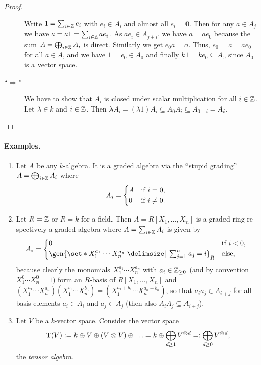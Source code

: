 \documentclass[12pt,a4paper]{scrartcl}
\theoremstyle{cplain}
\theoremstyle{cplain}
\theoremstyle{cplain}
\theoremstyle{definition}
\begin{document}
\begin{otherlanguage}{english}
\begin{proof}
\begin{description}
    Write $1 = \sum_{i \in \mathbb Z} e_i$ with $e_i \in A_i$ and almost all $e_i=0$. Then for any $a \in A_j$ we have $a = a1 = \sum_{i \in \mathbb Z}ae_i$. As $ae_i\in A_{j+i}$, we have $a = ae_0$ because the sum $A=\bigoplus_{i \in \mathbb Z}A_i$ is direct. Similarly we get $e_0a = a$. Thus, $e_0 = a = ae_0$ for all $a\in A$, and we have $1 = e_0 \in A_0$ and finally $k1 = ke_0 \subseteq A_0$ since $A_0$ is a vector space.
    \item[\enquote{$\Rightarrow$}] We have to show that $A_i$ is closed under scalar multiplication for all $i \in \mathbb Z$. Let $\lambda \in k$ and $i\in \mathbb Z$. Then $\lambda A_i = (\lambda1)A_i \subseteq A_0A_i \subseteq A_{0+i} = A_i$.
    \qedhere
  \end{description}
\end{proof}

\paragraph{Examples.}
\begin{enumerate}
  \item Let $A$ be any $k$-algebra. It is a graded algebra via the \enquote{stupid grading} $A = \bigoplus_{i \in \mathbb Z} A_i$ where \[ A_i = \begin{cases*}
                                 A & if $i=0$, \\
                                 0 & if $i \neq 0$.
                               \end{cases*} \]
  \item Let $R= \mathbb Z$ or $R = k$ for a field. Then $A= R[X_1,\ldots,X_n]$ is a graded ring respectively a graded algebra where $A= \sum_{i \in \mathbb Z} A_i$ is given by \[ A_i = \begin{cases*}
                                                                 0 & if $i<0$, \\
                                                                 \gen{\set*{X_1^{a_1}\cdots X_n^{a_n} \given \sum_{j=1}^n a_j =i}}_R & else,
                                                               \end{cases*} \]
  because clearly the monomials $X_1^{a_1}\cdots X_n^{a_n}$ with $a_i \in \mathbb Z_{\ge0}$ (and by convention $X_1^0\cdots X_n^0=1$) form an $R$-basis of $R[X_1,\ldots,X_n]$ and $(X_1^{a_1}\cdots X_n^{a_n})(X_1^{b_1}\cdots X_n^{b_n}) = (X_1^{a_1+b_1}\cdots X_n^{a_n+b_n})$, so that $a_ia_j \in A_{i+j}$ for all basis elements $a_i \in A_i$ and $a_j \in A_j$ (then also $A_iA_j \subseteq A_{i+j}$).
  \item Let $V$ be a $k$-vector space. Consider the vector space \[ \operatorname{T}(V) := k \oplus V \oplus (V \otimes V) \oplus \ldots = k \oplus \bigoplus_{d\ge1} V^{\otimes d} =: \bigoplus_{d \ge 0} V^{\otimes d}, \] the \emph{tensor algebra}.

\end{enumerate}
\end{otherlanguage}
\end{document}
